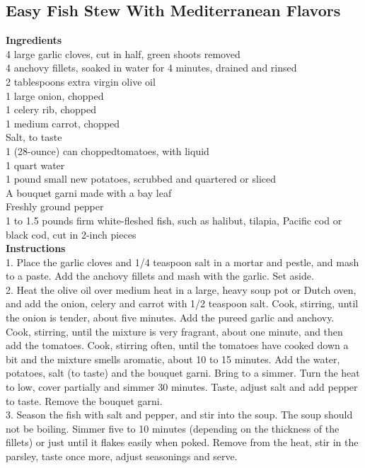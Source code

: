 \documentclass{article}
\numberwithin{figure}{section}
\numberwithin{equation}{section}
\begin{document}
\pagebreak
\subsection{Easy Fish Stew With Mediterranean Flavors}
{\bf Ingredients}\\
4 large garlic cloves, cut in half, green shoots removed\\
4 anchovy fillets, soaked in water for 4 minutes, drained and rinsed\\
2 tablespoons extra virgin olive oil\\
1 large onion, chopped\\
1 celery rib, chopped\\
1 medium carrot, chopped\\
Salt, to taste\\
1 (28-ounce) can choppedtomatoes, with liquid\\
1 quart water\\
1 pound small new potatoes, scrubbed and quartered or sliced\\
A bouquet garni made with a bay leaf\\
Freshly ground pepper\\
1 to 1.5 pounds firm white-fleshed fish, such as halibut, tilapia, Pacific cod or black cod, cut in 2-inch pieces\\

{\bf Instructions}\\
1.	Place the garlic cloves and 1/4 teaspoon salt in a mortar and pestle, and mash to a paste. Add the anchovy fillets and mash with the garlic. Set aside.\\

2.	Heat the olive oil over medium heat in a large, heavy soup pot or Dutch oven, and add the onion, celery and carrot with 1/2 teaspoon salt. Cook, stirring, until the onion is tender, about five minutes. Add the pureed garlic and anchovy. Cook, stirring, until the mixture is very fragrant, about one minute, and then add the tomatoes. Cook, stirring often, until the tomatoes have cooked down a bit and the mixture smells aromatic, about 10 to 15 minutes. Add the water, potatoes, salt (to taste) and the bouquet garni. Bring to a simmer. Turn the heat to low, cover partially and simmer 30 minutes. Taste, adjust salt and add pepper to taste. Remove the bouquet garni.\\

3.	Season the fish with salt and pepper, and stir into the soup. The soup should not be boiling. Simmer five to 10 minutes (depending on the thickness of the fillets) or just until it flakes easily when poked. Remove from the heat, stir in the parsley, taste once more, adjust seasonings and serve.\\
\end{document}
